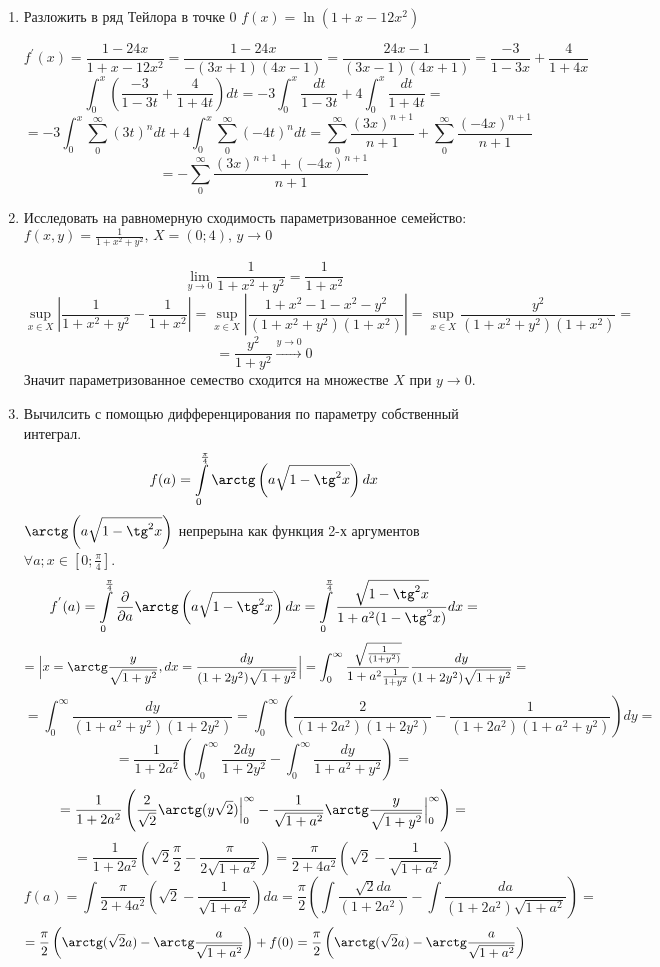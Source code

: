 \documentclass{article}
\begin{document}
\begin{large}
\begin{enumerate}
\item Разложить в ряд Тейлора в точке 0 $f(x) = \ln(1+x-12x^2)$

$$ f^{'}(x) = \frac{1-24x}{1+x-12x^2} = \frac{1-24x}{-(3x+1)(4x-1)} = \frac{24x-1}{(3x-1)(4x+1)} = \frac{-3}{1-3x}+\frac{4}{1+4x}$$
$$ \int_{0}^{x} \left( \frac{-3}{1-3t}+\frac{4}{1+4t} \right) dt = -3 \int_{0}^{x} \frac{dt}{1-3t} + 4 \int_{0}^{x} \frac{dt}{1+4t} = $$
$$ = -3 \int_{0}^{x} \sum_{0}^{\infty} (3t)^n dt + 4 \int_{0}^{x} \sum_{0}^{\infty} (-4t)^n dt = \sum_{0}^{\infty} \frac{(3x)^{n+1}}{n+1} + \sum_{0}^{\infty} \frac{(-4x)^{n+1}}{n+1} $$
$$ = -\sum_{0}^{\infty} \frac{(3x)^{n+1} + (-4x)^{n+1}}{n+1} $$

\item Исследовать на равномерную сходимость параметризованное семейство: \\ $f(x,y) = \frac{1}{1+x^2+y^2}, \, X = (0;4), \, y \to 0 $

$$ \lim_{y \to 0} \frac{1}{1+x^2+y^2} = \frac{1}{1 + x^2} $$
$$ \sup_{x \in X} \left| \frac{1}{1+x^2+y^2} - \frac{1}{1 + x^2} \right| = \sup_{x \in X} \left| \frac{1+x^2 - 1 - x^2-y^2}{(1+x^2+y^2)(1+x^2)}  \right| = \sup_{x \in X} \frac{y^2}{(1+x^2+y^2)(1+x^2)} = $$
$$ = \frac{y^2}{1+y^2} \xrightarrow{y \to 0} 0 $$
Значит параметризованное семество сходится на множестве $X$ при $y \to 0$.

\item Вычилсить с помощью дифференцирования по параметру собственный интеграл. 
$$ f(a) = \int\limits_0^{\frac{\pi}{4}} \arctg \left( a \sqrt{1-\tg^2x} \right)dx $$
$ \arctg \left( a \sqrt{1-\tg^2x} \right) $ непрерына как функция 2-х аргументов $\forall a; x\in [0;\frac{\pi}{4}]$.
$$ f^{'}(a) = \int\limits_0^{\frac{\pi}{4}} \frac{\partial}{\partial a} \arctg \left( a \sqrt{1-\tg^2x} \right)dx = \int\limits_0^{\frac{\pi}{4}} \frac{\sqrt{1-\tg^2x}}{1 + a^2(1-\tg^2x)}  dx = $$
$$ = \Big| x = \arctg \frac{y}{\sqrt{1+y^2}}, dx = \frac{dy}{(1+2y^2) \sqrt{1+y^2}} \Big| = \int_0^\infty \frac{\sqrt{\frac{1}{(1+y^2)}}}{1+a^2\frac{1}{1+y^2}} \frac{dy}{(1+2y^2) \sqrt{1+y^2}} = $$
$$ = \int_0^\infty \frac{dy}{(1+a^2+y^2)(1+2y^2)} = \int_0^\infty \left( \frac{2}{(1+2a^2)(1+2y^2)} - \frac{1}{(1+2a^2)(1+a^2+y^2)} \right) dy = $$
$$ = \frac{1}{1+2a^2} \left( \int_0^\infty \frac{2dy}{1+2y^2} - \int_0^\infty \frac{dy}{1+a^2+y^2} \right) = $$
$$ = \frac{1}{1+2a^2} \left( \frac{2}{\sqrt{2}} \arctg(y\sqrt{2}) \Big|_0^\infty - \frac{1}{\sqrt{1+a^2}} \arctg \frac{y}{\sqrt{1+y^2}} \Big|_0^\infty \right) = $$ 
$$ = \frac{1}{1+2a^2} \left( \sqrt{2} \frac{\pi}{2} - \frac{\pi}{2\sqrt{1+a^2}} \right) = \frac{\pi}{2+4a^2} \left( \sqrt{2} - \frac{1}{\sqrt{1+a^2}} \right) $$
$$ f(a) = \int \frac{\pi}{2+4a^2} \left( \sqrt{2} - \frac{1}{\sqrt{1+a^2}} \right)da = \frac{\pi}{2} \left( \int \frac{\sqrt{2}da}{(1+2a^2)} - \int \frac{da}{(1+2a^2)\sqrt{1+a^2}} \right) = $$
$$ = \frac{\pi}{2} \left( \arctg (\sqrt{2}a) - \arctg \frac{a}{\sqrt{1+a^2}} \right) + f(0) = \frac{\pi}{2} \left( \arctg (\sqrt{2}a) - \arctg \frac{a}{\sqrt{1+a^2}} \right) $$



\end{enumerate}
\end{large}
\end{document}
